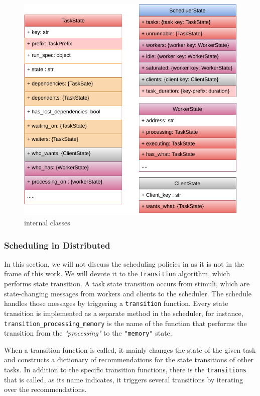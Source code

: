 \begin{figure}[tb]\centering
\includegraphics{figures/DaskScheduler.pdf}
\caption{\dask internal classes }
\label{figdaskinternal}
\end{figure}

\subsubsection{Scheduling in \dask Distributed}
In this section, we will not discuss the scheduling policies in \dask as it is not in the frame of this work. We will devote it to the \texttt{transition} algorithm, which performs state transition.
A task state transition occurs from stimuli, which are state-changing messages from workers and clients to the scheduler. 
The schedule handles those messages by triggering a \texttt{transition} function. Every state transition is implemented as a separate method in the scheduler, for instance, \texttt{transition\_processing\_memory} is the name of the function that performs the transition from the \textit{"processing"} to the \texttt{"memory"} state.

When a transition function is called, it mainly changes the state of the given task and constructs a dictionary of recommendations for the state transitions of other tasks. In addition to the specific transition functions, there is the \texttt{transitions} that is called, as its name indicates, it triggers several transitions by iterating over the recommendations. 

